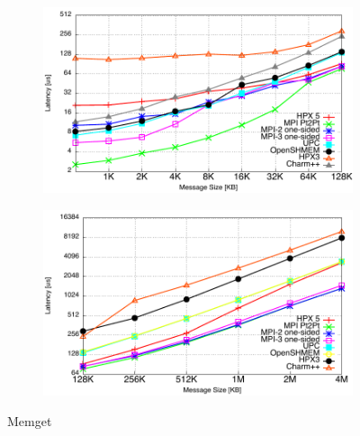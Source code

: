 \documentclass[10pt]{article}
\begin{document}
\begin{figure}[!ht]
\centering
\begin{subfigure}[b]{0.45\textwidth}
\includegraphics[width=\textwidth]{cutter/plots/get_latency_small}
\label{fig:get-small}
\end{subfigure}%
\begin{subfigure}[b]{0.45\textwidth}
\includegraphics[width=\textwidth]{cutter/plots/get_latency_large}
\label{fig:get-large}
\end{subfigure}%
\caption{Memget}
\label{fig:memget}
\end{figure}
\end{document}
